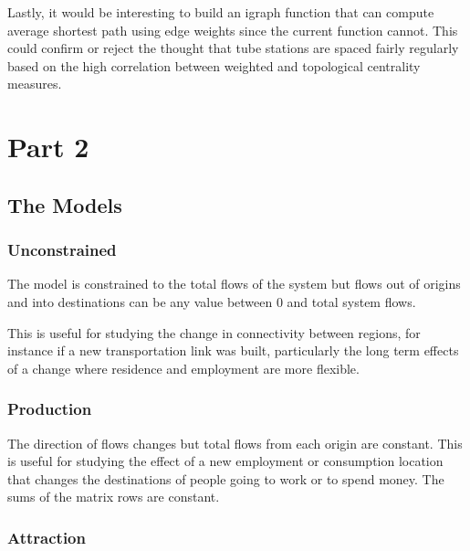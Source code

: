 \documentclass[11pt]{article} %
\begin{document}
Lastly, it would be interesting to build an igraph function that can compute average shortest path using edge weights since the current function cannot. This could confirm or reject the thought that tube stations are spaced fairly regularly based on the high correlation between weighted and topological centrality measures. 



\pagebreak

\section{Part 2}

\subsection{The Models}

\subsubsection{Unconstrained}

The model is constrained to the total flows of the system but flows out of origins and into destinations can be any value between 0 and total system flows. 

This is useful for studying the change in connectivity between regions, for instance if a new transportation link was built, particularly the long term effects of a change where residence and employment are more flexible. 

\subsubsection{Production}

The direction of flows changes but total flows from each origin are constant. This is useful for studying the effect of a new employment or consumption location that changes the destinations of people going to work or to spend money. The sums of the matrix rows are constant. 

\subsubsection{Attraction}
\end{document}
